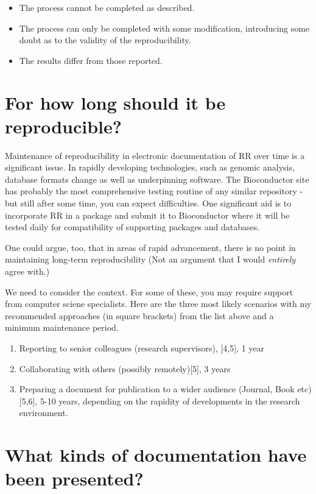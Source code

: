 \documentclass[titlepage]{book}\usepackage{knitr}
\begin{document}
\begin{itemize}
\item{ The process cannot be completed as described.}
\item{ The process can only be completed with some modification, introducing some doubt as to the validity of the reproducibility.}
\item{The results differ from those reported.}
\end{itemize}


\section{For how long should it be reproducible?}


Maintenance of reproducibility in electronic documentation of RR over time is a significant issue. In rapidly developing technologies, such as genomic analysis, database formats change as well as underpinning software.  The Bioconductor site has probably the most comprehensive testing routine of any similar repository - but still after some time, you can expect difficulties.  One significant aid is to incorporate RR in a package and submit it to Bioconductor where it will be tested daily for compatibility of supporting packages and databases.

One could argue, too, that in areas of rapid advancement,  there is no point in maintaining long-term reproducibility (Not an argument that I would \emph{entirely} agree with.)

We need to consider the context. For some of these, you may require support from computer sciene specialists. Here are the three most likely scenarios with my recommended approaches (in square brackets)  from the list above and a minimum maintenance period.
\begin{enumerate}
\item{Reporting to senior colleagues (research supervisors), [4,5], 1 year}
\item{Collaborating with others (possibly remotely)[5], 3 years}
\item{Preparing a document for publication to a wider audience (Journal, Book etc)[5,6], 5-10 years, depending on the rapidity of developments in the research environment.}
\end{enumerate}

\section{What kinds of documentation have been presented?}
\end{document}

